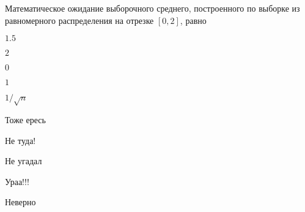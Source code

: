 
\begin{question}
Математическое ожидание выборочного среднего, построенного по выборке из
равномерного распределения на отрезке \([0,2]\), равно
\begin{answerlist}
  \item \(1.5\)
  \item \(2\)
  \item \(0\)
  \item \(1\)
  \item \(1/\sqrt{n}\)
\end{answerlist}
\end{question}

\begin{solution}
\begin{answerlist}
  \item Тоже ересь
  \item Не туда!
  \item Не угадал
  \item Ураа!!!
  \item Неверно
\end{answerlist}
\end{solution}

